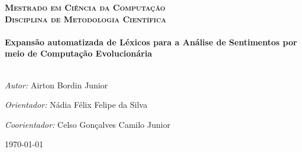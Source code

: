 \documentclass[a4paper,11pt]{article}
\begin{document}
\begin{titlepage}
\begin{center}
\begin{figure}
\begin{minipage}{.5\textwidth}
\end{minipage}
\end{figure}



\textsc{\large \textbf{Mestrado em Ciência da Computação}}\\[0.5cm]
\textsc{\large \textbf{Disciplina de Metodologia Científica}}\\[1.5cm] %


\HRule \\[0.4cm]
{ \huge \bfseries Expansão automatizada de Léxicos para a Análise de Sentimentos por meio de Computação Evolucionária}\\[0.4cm] %
\HRule \\[1.5cm]


\begin{framed}
\emph{Autor:} Airton Bordin Junior
\par
\emph{Orientador:} Nádia Félix Felipe da Silva
\par
\emph{Coorientador:} Celso Gonçalves Camilo Junior
\end{framed}

\vspace*{3cm}


{\large \today}\\ %

\end{center}


\vfill %

\end{titlepage}
\end{document}
